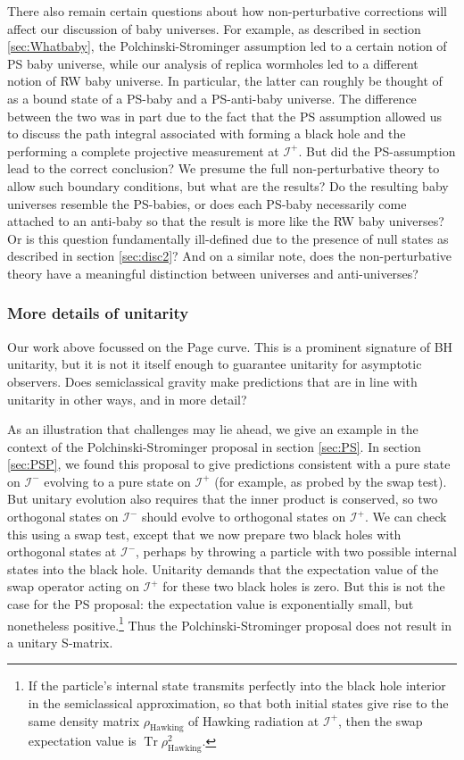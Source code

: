 \documentclass[letterpaper,12pt]{article}
\DeclareMathOperator{\Tr}{Tr}
\newcommand*{\scri}{\mathscr{I}} %
\begin{document}
There also remain certain questions about how non-perturbative corrections will affect our discussion of baby universes.  For example, as described in section \ref{sec:Whatbaby}, the Polchinski-Strominger assumption led to a certain notion of PS baby universe, while our analysis of replica wormholes led to a different notion of RW baby universe.  In particular, the latter can roughly be thought of as a bound state of a PS-baby and a PS-anti-baby universe.  The difference between the two was in part due to the fact that the PS assumption allowed us to discuss the path integral associated with forming a black hole and the performing a complete projective measurement at $\scri^+$.  But did the PS-assumption lead to the correct conclusion?  We presume the full non-perturbative theory to allow such boundary conditions, but what are the results?  Do the resulting baby universes resemble the PS-babies, or does each PS-baby necessarily come attached to an anti-baby so that the result is more like the RW baby universes?  Or is this question fundamentally ill-defined  due to the presence of null states as described in section \ref{sec:disc2}?  And on a similar note, does the non-perturbative theory have a meaningful distinction between universes and anti-universes?

\subsubsection{More details of unitarity}

Our work above focussed on the Page curve.  This is a prominent signature of BH unitarity, but it is not it itself enough to guarantee unitarity for asymptotic observers. Does semiclassical gravity make predictions that are in line with unitarity in other ways, and in more detail?

As an illustration that challenges may lie ahead, we give an example in the context of the Polchinski-Strominger proposal in section \ref{sec:PS}. In section \ref{sec:PSP}, we found this proposal to give predictions consistent with a pure state on $\scri^-$ evolving to a pure state on $\scri^+$ (for example, as probed by the swap test). But unitary evolution also requires that the inner product is conserved, so two orthogonal states on $\scri^-$ should evolve to orthogonal states on $\scri^+$. We can check this using a swap test, except that we now prepare two black holes with orthogonal states at $\scri^-$, perhaps by throwing a particle with two possible internal states into the black hole. Unitarity demands that the expectation value of the swap operator acting on $\scri^+$ for these two black holes is zero. But this is not the case for the PS proposal: the expectation value is exponentially small, but nonetheless positive.\footnote{If the particle's internal state transmits perfectly into the black hole interior in the semiclassical approximation, so that both initial states give rise to the same density matrix $\rho_\mathrm{Hawking}$ of Hawking radiation at $\scri^+$, then the swap expectation value is $\Tr \rho_\mathrm{Hawking}^2$.} Thus the Polchinski-Strominger proposal does not result in a unitary S-matrix.
\end{document}
